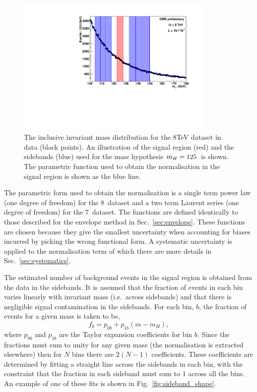 \begin{figure}
  \begin{center}
    \includegraphics[width=0.85\textwidth]{analysis/plots/sideband/invmass.pdf}
    \caption[The invariant mass distribution for the 8~\TeV dataset]{The inclusive invariant mass distribution for the 8TeV dataset in data (black points). An illustration of the signal region (red) and the sidebands (blue) used for the mass hypothesis $m_{H}=125$~\GeV is shown. The parametric function used to obtain the normalisation in the signal region is shown as the blue line.}
    \label{fig:sideband_norm}
  \end{center}
\end{figure}

The parametric form used to obtain the normalisation is a single term power law (one degree of freedom) for the 8~\TeV dataset and a two term Laurent series (one degree of freedom) for the 7~\TeV dataset. The functions are defined identically to those described for the envelope method in Sec.~\ref{sec:envelope}. These functions are chosen because they give the smallest uncertainty when accounting for biases incurred by picking the wrong functional form. A systematic uncertainty is applied to the normalisation term of which there are more details in Sec.~\ref{sec:systematics}.

The estimated number of background events in the signal region is obtained from the data in the sidebands. It is assumed that the fraction of events in each bin varies linearly with invariant mass (i.e.~across sidebands) and that there is negligible signal contamination in the sidebands. For each bin, $b$, the fraction of events for a given mass is taken to be,
\begin{equation}
  f_{b} = p_{0b} + p_{1b}(m-m_{H}),
\end{equation}
where $p_{0b}$ and $p_{1b}$ are the Taylor expansion coefficients for bin $b$. Since the fractions must sum to unity for any given mass (the normalisation is extracted elsewhere) then for $N$ bins there are $2(N-1)$ coefficients. These coefficients are determined by fitting a straight line across the sidebands in each bin, with the constraint that the fraction in each sideband must sum to 1 across all the bins. An example of one of these fits is shown in Fig.~\ref{fig:sideband_shape}.

